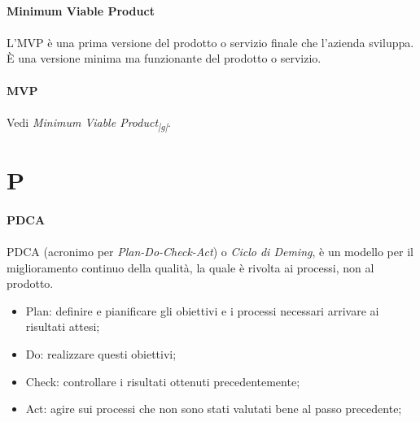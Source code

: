 \documentclass[10pt, a4paper]{article}
\newcommand{\pg}{\textsubscript{|g|}}
\begin{document}
\paragraph{Minimum Viable Product}\noindent\hrulefill
\paragraph{}L’MVP è una prima versione del prodotto o servizio finale che l’azienda sviluppa. È una versione minima ma funzionante del prodotto o servizio.

\vspace{2em}
\paragraph{MVP}\noindent\hrulefill 
\paragraph{}Vedi \textit{Minimum Viable Product\pg}.




\newpage
\section{P}
\vspace{2em}
\paragraph{PDCA}\noindent\hrulefill
\paragraph{}PDCA (acronimo per \textit{Plan-Do-Check-Act}) o \textit{Ciclo di Deming}, è un modello per il
miglioramento continuo della qualità, la quale è rivolta ai processi, non al prodotto.
\begin{itemize}
    \item Plan: definire e pianificare gli obiettivi e i processi necessari arrivare ai risultati attesi;
    \item Do: realizzare questi obiettivi;
    \item Check: controllare i risultati ottenuti precedentemente;
    \item Act: agire sui processi che non sono stati valutati  bene al passo precedente;
\end{itemize}
\end{document}
